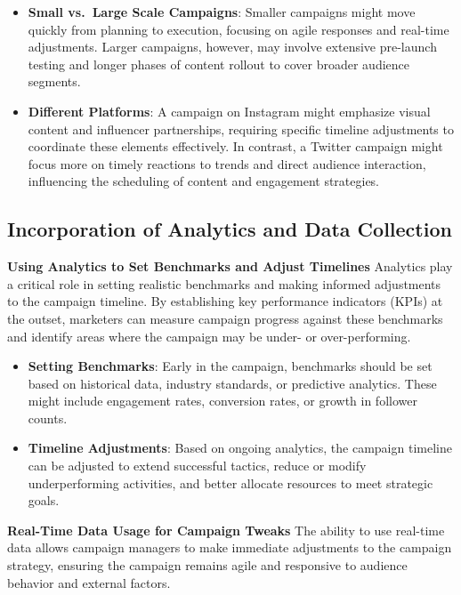 \documentclass[
]{book}
\providecommand{\tightlist}{%
  \setlength{\itemsep}{0pt}\setlength{\parskip}{0pt}}
\begin{document}
\begin{itemize}
\tightlist
\item
  \textbf{Small vs.~Large Scale Campaigns}: Smaller campaigns might move quickly from planning to execution, focusing on agile responses and real-time adjustments. Larger campaigns, however, may involve extensive pre-launch testing and longer phases of content rollout to cover broader audience segments.
\item
  \textbf{Different Platforms}: A campaign on Instagram might emphasize visual content and influencer partnerships, requiring specific timeline adjustments to coordinate these elements effectively. In contrast, a Twitter campaign might focus more on timely reactions to trends and direct audience interaction, influencing the scheduling of content and engagement strategies.
\end{itemize}

\hypertarget{incorporation-of-analytics-and-data-collection}{%
\subsection*{Incorporation of Analytics and Data Collection}\label{incorporation-of-analytics-and-data-collection}}

\textbf{Using Analytics to Set Benchmarks and Adjust Timelines}
Analytics play a critical role in setting realistic benchmarks and making informed adjustments to the campaign timeline. By establishing key performance indicators (KPIs) at the outset, marketers can measure campaign progress against these benchmarks and identify areas where the campaign may be under- or over-performing.

\begin{itemize}
\tightlist
\item
  \textbf{Setting Benchmarks}: Early in the campaign, benchmarks should be set based on historical data, industry standards, or predictive analytics. These might include engagement rates, conversion rates, or growth in follower counts.
\item
  \textbf{Timeline Adjustments}: Based on ongoing analytics, the campaign timeline can be adjusted to extend successful tactics, reduce or modify underperforming activities, and better allocate resources to meet strategic goals.
\end{itemize}

\textbf{Real-Time Data Usage for Campaign Tweaks}
The ability to use real-time data allows campaign managers to make immediate adjustments to the campaign strategy, ensuring the campaign remains agile and responsive to audience behavior and external factors.
\end{document}
